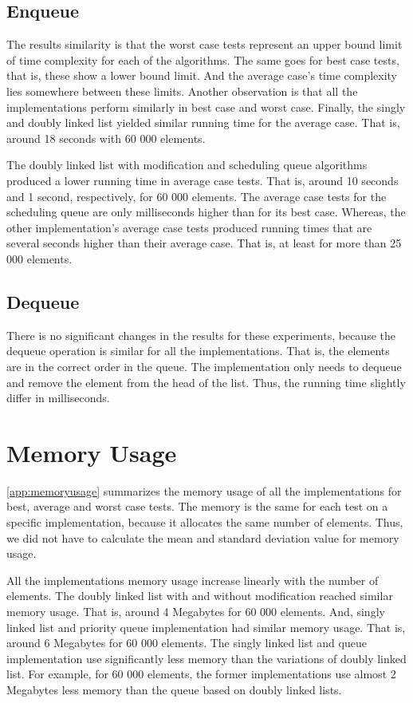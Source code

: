 \documentclass[a4paper,11pt]{kth-mag}
\newcommand*{\skippara}{\par\vspace{\baselineskip} \noindent}
\begin{document}
\subsection{Enqueue}
The results similarity is that the worst case tests represent an upper bound limit of time complexity for each of the algorithms.
The same goes for best case tests, that is, these show a lower bound limit.
And the average case's time complexity lies somewhere between these limits.
Another observation is that all the implementations perform similarly in best case and worst case.
Finally, the singly and doubly linked list yielded similar running time for the average case.
That is, around 18 seconds with 60 000 elements.

\skippara The doubly linked list with modification and scheduling queue algorithms produced a lower running time in average case tests.
That is, around 10 seconds and 1 second, respectively, for 60 000 elements.
The average case tests for the scheduling queue are only milliseconds higher than for its best case.
Whereas, the other implementation's average case tests produced running times that are several seconds higher than their average case.
That is, at least for more than 25 000 elements.



\subsection{Dequeue}

There is no significant changes in the results for these experiments, because the dequeue operation is similar for all the implementations.
That is, the elements are in the correct order in the queue.
The implementation only needs to dequeue and remove the element from the head of the list.
Thus, the running time slightly differ in milliseconds.

\section{Memory Usage}

\cref{app:memoryusage} summarizes the memory usage of all the implementations for best, average and worst case tests.
The memory is the same for each test on a specific implementation, because it allocates the same number of elements.
Thus, we did not have to calculate the mean and standard deviation value for memory usage.

\skippara All the implementations memory usage increase linearly with the number of elements.
The doubly linked list with and without modification reached similar memory usage.
That is, around 4 Megabytes for 60 000 elements.
And, singly linked list and priority queue implementation had similar memory usage.
That is, around 6 Megabytes for 60 000 elements.
The singly linked list and queue implementation use significantly less memory than the variations of doubly linked list.
For example, for 60 000 elements, the former implementations use almost 2 Megabytes less memory than the queue based on doubly linked lists.
\end{document}
